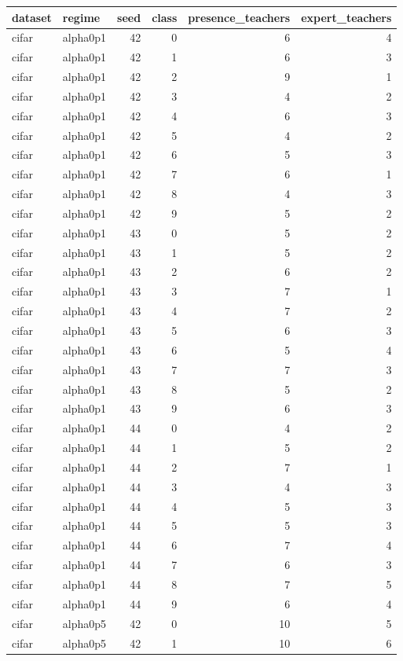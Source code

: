 \begin{tabular}{llrrrr}
\toprule
dataset & regime & seed & class & presence\_teachers & expert\_teachers \\
\midrule
cifar & alpha0p1 & 42 & 0 & 6 & 4 \\
cifar & alpha0p1 & 42 & 1 & 6 & 3 \\
cifar & alpha0p1 & 42 & 2 & 9 & 1 \\
cifar & alpha0p1 & 42 & 3 & 4 & 2 \\
cifar & alpha0p1 & 42 & 4 & 6 & 3 \\
cifar & alpha0p1 & 42 & 5 & 4 & 2 \\
cifar & alpha0p1 & 42 & 6 & 5 & 3 \\
cifar & alpha0p1 & 42 & 7 & 6 & 1 \\
cifar & alpha0p1 & 42 & 8 & 4 & 3 \\
cifar & alpha0p1 & 42 & 9 & 5 & 2 \\
cifar & alpha0p1 & 43 & 0 & 5 & 2 \\
cifar & alpha0p1 & 43 & 1 & 5 & 2 \\
cifar & alpha0p1 & 43 & 2 & 6 & 2 \\
cifar & alpha0p1 & 43 & 3 & 7 & 1 \\
cifar & alpha0p1 & 43 & 4 & 7 & 2 \\
cifar & alpha0p1 & 43 & 5 & 6 & 3 \\
cifar & alpha0p1 & 43 & 6 & 5 & 4 \\
cifar & alpha0p1 & 43 & 7 & 7 & 3 \\
cifar & alpha0p1 & 43 & 8 & 5 & 2 \\
cifar & alpha0p1 & 43 & 9 & 6 & 3 \\
cifar & alpha0p1 & 44 & 0 & 4 & 2 \\
cifar & alpha0p1 & 44 & 1 & 5 & 2 \\
cifar & alpha0p1 & 44 & 2 & 7 & 1 \\
cifar & alpha0p1 & 44 & 3 & 4 & 3 \\
cifar & alpha0p1 & 44 & 4 & 5 & 3 \\
cifar & alpha0p1 & 44 & 5 & 5 & 3 \\
cifar & alpha0p1 & 44 & 6 & 7 & 4 \\
cifar & alpha0p1 & 44 & 7 & 6 & 3 \\
cifar & alpha0p1 & 44 & 8 & 7 & 5 \\
cifar & alpha0p1 & 44 & 9 & 6 & 4 \\
cifar & alpha0p5 & 42 & 0 & 10 & 5 \\
cifar & alpha0p5 & 42 & 1 & 10 & 6 \\

\end{tabular}
